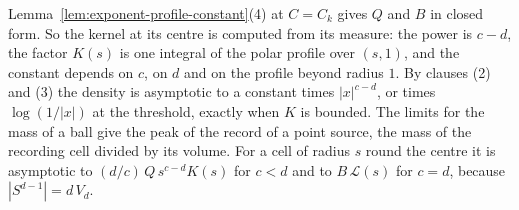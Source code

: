 Lemma~\ref{lem:exponent-profile-constant}(4) at $C = C_k$ gives $Q$ and $B$ in closed form.
So the kernel at its centre is computed from its \Levy{} measure: the power is $c - d$, the
factor $K(s)$ is one integral of the polar profile over $(s,1)$, and the constant depends on
$c$, on $d$ and on the profile beyond radius $1$. By clauses (2) and (3) the density is
asymptotic to a constant times $|x|^{c-d}$, or times $\log(1/|x|)$ at the threshold, exactly
when $K$ is bounded. The
limits for the mass of a ball give the peak of the record of a point source, the mass of the
recording cell divided by its volume. For a cell of radius $s$ round the centre it is
asymptotic to $(d/c)\,Q\,s^{c-d}K(s)$ for $c < d$ and to $B\,\mathcal{L}(s)$ for $c = d$,
because $|S^{d-1}| = d\,V_d$.

